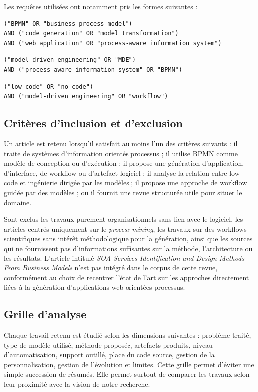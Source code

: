 \documentclass[12pt,a4paper]{article}
\begin{document}
Les requêtes utilisées ont notamment pris les formes suivantes :

\begin{verbatim}
("BPMN" OR "business process model")
AND ("code generation" OR "model transformation")
AND ("web application" OR "process-aware information system")
\end{verbatim}

\begin{verbatim}
("model-driven engineering" OR "MDE")
AND ("process-aware information system" OR "BPMN")
\end{verbatim}

\begin{verbatim}
("low-code" OR "no-code")
AND ("model-driven engineering" OR "workflow")
\end{verbatim}

\subsection{Critères d'inclusion et d'exclusion}

Un article est retenu lorsqu'il satisfait au moins l'un des critères suivants : il traite de systèmes d'information orientés processus ; il utilise BPMN comme modèle de conception ou d'exécution ; il propose une génération d'application, d'interface, de workflow ou d'artefact logiciel ; il analyse la relation entre low-code et ingénierie dirigée par les modèles ; il propose une approche de workflow guidée par des modèles ; ou il fournit une revue structurée utile pour situer le domaine.

Sont exclus les travaux purement organisationnels sans lien avec le logiciel, les articles centrés uniquement sur le \textit{process mining}, les travaux sur des workflows scientifiques sans intérêt méthodologique pour la génération, ainsi que les sources qui ne fournissent pas d'informations suffisantes sur la méthode, l'architecture ou les résultats. L'article intitulé \textit{SOA Services Identification and Design Methods From Business Models} n'est pas intégré dans le corpus de cette revue, conformément au choix de recentrer l'état de l'art sur les approches directement liées à la génération d'applications web orientées processus.

\subsection{Grille d'analyse}

Chaque travail retenu est étudié selon les dimensions suivantes : problème traité, type de modèle utilisé, méthode proposée, artefacts produits, niveau d'automatisation, support outillé, place du code source, gestion de la personnalisation, gestion de l'évolution et limites. Cette grille permet d'éviter une simple succession de résumés. Elle permet surtout de comparer les travaux selon leur proximité avec la vision de notre recherche.
\end{document}
